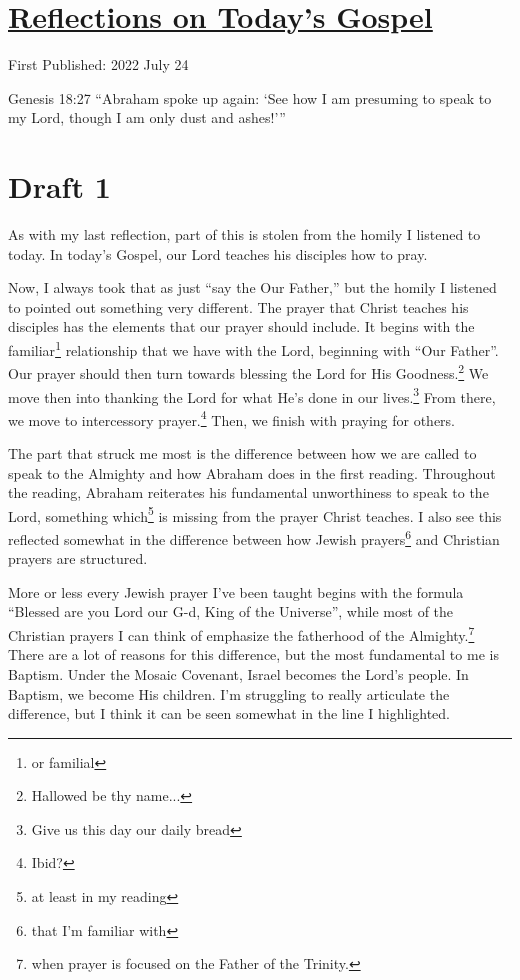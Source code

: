 \documentclass[12pt]{article}[titlepage]
\newcommand{\say}[1]{``#1''}
\newcommand{\nsay}[1]{`#1'}
\newcommand{\1}{\={a}}
\newcommand{\2}{\={e}}
\newcommand{\3}{\={\i}}
\newcommand{\4}{\=o}
\newcommand{\5}{\=u}
\newcommand{\6}{\={A}}
\renewcommand{\,}{\textsuperscript{,}}
\begin{document}
\doublespacing
\section{\href{reflections-on-readings-17-ordinary-c-22.html}{Reflections on Today's Gospel}}
First Published: 2022 July 24

Genesis 18:27 \say{Abraham spoke up again: \nsay{See how I am presuming to speak to my Lord, though I am only dust and ashes!}}

\section{Draft 1}
As with my last reflection, part of this is stolen from the homily I listened to today.
In today's Gospel, our Lord teaches his disciples how to pray.

Now, I always took that as just \say{say the Our Father,} but the homily I listened to pointed out something very different.
The prayer that Christ teaches his disciples has the elements that our prayer should include.
It begins with the familiar\footnote{or familial} relationship that we have with the Lord, beginning with \say{Our Father}.
Our prayer should then turn towards blessing the Lord for His Goodness.\footnote{Hallowed be thy name...}
We move then into thanking the Lord for what He's done in our lives.\footnote{Give us this day our daily bread}
From there, we move to intercessory prayer.\footnote{Ibid?}
Then, we finish with praying for others.

The part that struck me most is the difference between how we are called to speak to the Almighty and how Abraham does in the first reading.
Throughout the reading, Abraham reiterates his fundamental unworthiness to speak to the Lord, something which\footnote{at least in my reading} is missing from the prayer Christ teaches.
I also see this reflected somewhat in the difference between how Jewish prayers\footnote{that I'm familiar with} and Christian prayers are structured.

More or less every Jewish prayer I've been taught begins with the formula \say{Blessed are you Lord our G-d, King of the Universe}, while most of the Christian prayers I can think of emphasize the fatherhood of the Almighty.\footnote{when prayer is focused on the Father of the Trinity.}
There are a lot of reasons for this difference, but the most fundamental to me is Baptism.
Under the Mosaic Covenant, Israel becomes the Lord's people.
In Baptism, we become His children.
I'm struggling to really articulate the difference, but I think it can be seen somewhat in the line I highlighted.
\end{document}
